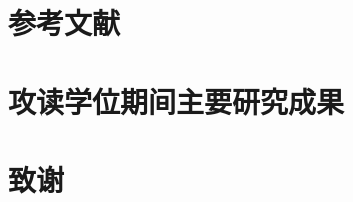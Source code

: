 
\renewcommand\appendix{\setcounter{secnumdepth}{-2}}
\appendix
\section{参考文献}
\nocite{*} %
\newpage

\section{攻读学位期间主要研究成果} %
\lipsum
\newpage

\section{致谢} %
\lipsum
\newpage